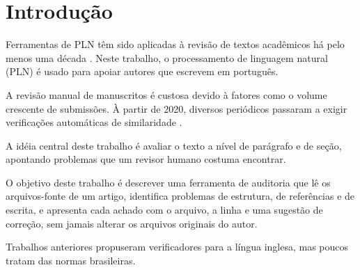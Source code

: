 \section{Introdução}\label{sec:introducao}

Ferramentas de PLN têm sido aplicadas à revisão de textos acadêmicos há pelo
menos uma década \cite{lecun2015}. Neste trabalho, o processamento de linguagem
natural (PLN) é usado para apoiar autores que escrevem em português.

A revisão manual de manuscritos é custosa devido à fatores como o volume
crescente de submissões. À partir de 2020, diversos periódicos passaram a
exigir verificações automáticas de similaridade \cite{devlin2019}.

A idéia central deste trabalho é avaliar o texto a nível de parágrafo e de
seção, apontando problemas que um revisor humano costuma encontrar.

O objetivo deste trabalho é descrever uma ferramenta de auditoria que lê os
arquivos-fonte de um artigo, identifica problemas de estrutura, de referências
e de escrita, e apresenta cada achado com o arquivo, a linha e uma sugestão de
correção, sem jamais alterar os arquivos originais do autor.

Trabalhos anteriores \cite{silva2099} propuseram verificadores para a língua
inglesa, mas poucos tratam das normas brasileiras.
